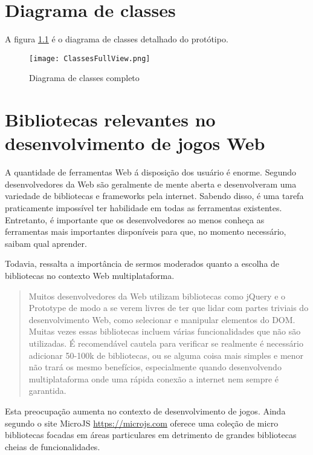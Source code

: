 \chapter{Diagrama de classes}

A figura \ref{fig:fullDiagram} é o diagrama de classes detalhado do protótipo.
\begin{figure}[H]
    \centering
    \texttt{[image: ClassesFullView.png]}
	\caption{Diagrama de classes completo}
    \label{fig:fullDiagram}
\end{figure}

\chapter{Bibliotecas relevantes no desenvolvimento de jogos Web}

A quantidade de ferramentas Web á disposição dos usuário é
enorme. Segundo \citet{html5mostwanted} desenvolvedores da Web
são geralmente de mente aberta e desenvolveram uma variedade de
bibliotecas e frameworks pela internet. Sabendo disso, é uma tarefa
praticamente impossível ter habilidade em todas as ferramentas
existentes. Entretanto, é importante que os desenvolvedores ao menos
conheça as ferramentas mais importantes disponíveis para que, no
momento necessário, saibam qual aprender.

Todavia, \citet{creatingFun} ressalta a importância de sermos moderados
quanto a escolha de bibliotecas no contexto Web multiplataforma.

\begin{quote}
Muitos desenvolvedores da Web utilizam bibliotecas como jQuery e o
Prototype de modo a se verem livres de ter que lidar com
partes triviais do desenvolvimento Web, como selecionar e
manipular elementos do DOM. Muitas vezes essas bibliotecas incluem
várias funcionalidades que não são utilizadas. É recomendável
cautela para verificar se realmente é necessário adicionar 50-100k
de bibliotecas, ou se alguma coisa mais simples e menor não trará
os mesmo benefícios, especialmente quando desenvolvendo
multiplataforma onde uma rápida conexão a internet nem sempre é
garantida.
\end{quote}

Esta preocupação aumenta no contexto de desenvolvimento
de jogos. Ainda segundo \citet{creatingFun} o site MicroJS
\url{https://microjs.com} oferece uma coleção de micro bibliotecas
focadas em áreas particulares em detrimento de grandes bibliotecas
cheias de funcionalidades.

